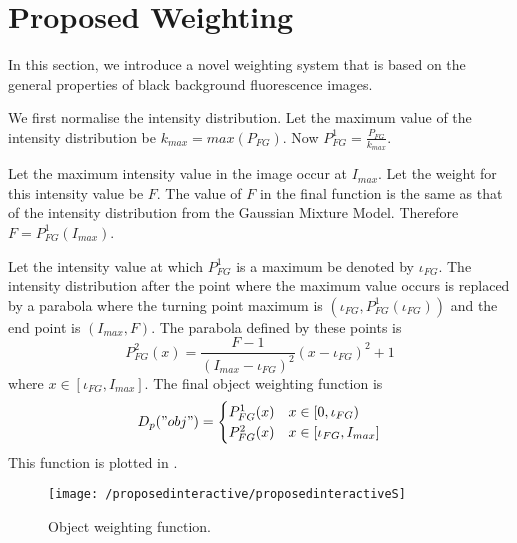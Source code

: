 \section{Proposed Weighting}
\label{sec:interactiveproposedweighting}

In this section, we introduce a novel weighting system that is based on the general properties of black background fluorescence images.

\begin{definition}
	We first normalise the intensity distribution. Let the maximum value of the intensity distribution be $k_{max}= max(P_{FG})$. Now $P_{FG}^{1} = \frac{P_{FG}}{k_{max}}$.
	
	Let the maximum intensity value in the image occur at $I_{max}$. Let the weight for this intensity value be $F$. The value of $F$ in the final function is the same as that of the intensity distribution from the Gaussian Mixture Model. Therefore $F = P_{FG}^{1}(I_{max})$.
	
	Let the intensity value at which $P_{FG}^{1}$ is a maximum be denoted by $\iota_{FG}$. The intensity distribution after the point where the maximum value occurs is replaced by a parabola where the turning point maximum is $\left(\iota_{FG}, P_{FG}^{1}(\iota_{FG})\right)$ and the end point is $(I_{max},F)$. The parabola defined by these points is 
	\begin{equation}
		P_{FG}^2(x) = \frac{F-1}{(I_{max}-\iota_{FG})^2}(x-\iota_{FG})^2 +1 
	\end{equation}
	where $x \in [\iota_{FG},I_{max}]$.
	The final object weighting function  is
	\begin{equation}
		D_p("obj") = \begin{cases} 
		P_{FG}^1(x) & x \in [0,\iota_{FG}) \\
		P_{FG}^2(x) & x \in [\iota_{FG},I_{max}]
		\end{cases}
	\end{equation}
	This function is plotted in . 
		
	\begin{figure}[!h]
		\centering
		\texttt{[image: /proposedinteractive/proposedinteractiveS]}
		\caption{Object weighting function.}
		\label{fig:proposedinteractiveS}
	\end{figure}
\end{definition}

